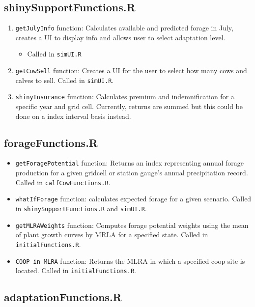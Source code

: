 \documentclass[11pt]{article}
\begin{document}
\subsection{shinySupportFunctions.R}
\begin{enumerate}
\item \verb!getJulyInfo! function: Calculates available and predicted forage in July, creates a
    UI to display info and allows user to select adaptation level.
    \begin{itemize}
    \item Called in \verb!simUI.R!
    \end{itemize}
\item \verb!getCowSell! function: Creates a UI for the user to select how many cows and calves to sell. Called in \verb!simUI.R!.
\item \verb!shinyInsurance! function: Calculates premium and indemnification for a specific year and grid cell. Currently, returns are summed but this could be done on a index interval basis instead.
\end{enumerate}

\subsection{forageFunctions.R}

\begin{itemize}
	\item \verb!getForagePotential! function: Returns an index representing
  annual forage production for a given gridcell or station gauge's annual precipitation record. Called in \verb!calfCowFunctions.R!.
	\item \verb!whatIfForage! function: calculates expected forage for a given scenario. Called in \verb!shinySupportFunctions.R! and \verb!simUI.R!.
	\item \verb!getMLRAWeights! function: Computes forage potential weights using the
  mean of plant growth curves by MRLA for a specified state. Called in \verb!initialFunctions.R!.
  	\item \verb!COOP_in_MLRA! function: Returns the MLRA in which a specified
  coop site is located. Called in \verb!initialFunctions.R!.
\end{itemize}

\subsection{adaptationFunctions.R}
\end{document}
